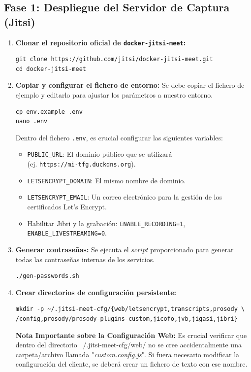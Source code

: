 \subsection{Fase 1: Despliegue del Servidor de Captura (Jitsi)}
\begin{enumerate}
    \item \textbf{Clonar el repositorio oficial de \texttt{docker-jitsi-meet}:}
    \begin{verbatim}
git clone https://github.com/jitsi/docker-jitsi-meet.git
cd docker-jitsi-meet
    \end{verbatim}

    \item \textbf{Copiar y configurar el fichero de entorno:} Se debe copiar el fichero de ejemplo y editarlo para ajustar los parámetros a nuestro entorno.
    \begin{verbatim}
cp env.example .env
nano .env
    \end{verbatim}
    Dentro del fichero \texttt{.env}, es crucial configurar las siguientes variables:
    \begin{itemize}
        \item \texttt{PUBLIC\_URL}: El dominio público que se utilizará \\(ej. \texttt{https://mi-tfg.duckdns.org}).
        \item \texttt{LETSENCRYPT\_DOMAIN}: El mismo nombre de dominio.
        \item \texttt{LETSENCRYPT\_EMAIL}: Un correo electrónico para la gestión de los certificados Let's Encrypt.
        \item Habilitar Jibri y la grabación: \texttt{ENABLE\_RECORDING=1},\\ \texttt{ENABLE\_LIVESTREAMING=0}.
    \end{itemize}

    \item \textbf{Generar contraseñas:} Se ejecuta el \textit{script} proporcionado para generar todas las contraseñas internas de los servicios.
    \begin{verbatim}
./gen-passwords.sh
    \end{verbatim}

    \item \textbf{Crear directorios de configuración persistente:}
    \begin{verbatim}
mkdir -p ~/.jitsi-meet-cfg/{web/letsencrypt,transcripts,prosody \ 
/config,prosody/prosody-plugins-custom,jicofo,jvb,jigasi,jibri}
    \end{verbatim}
    \textbf{Nota Importante sobre la Configuración Web:} Es crucial verificar que dentro del directorio ~/.jitsi-meet-cfg/web/ no se cree accidentalmente una carpeta/archivo llamada "\textit{custom.config.js}". Si fuera necesario modificar la configuración del cliente, se deberá crear un fichero de texto con ese nombre.


\end{enumerate}
